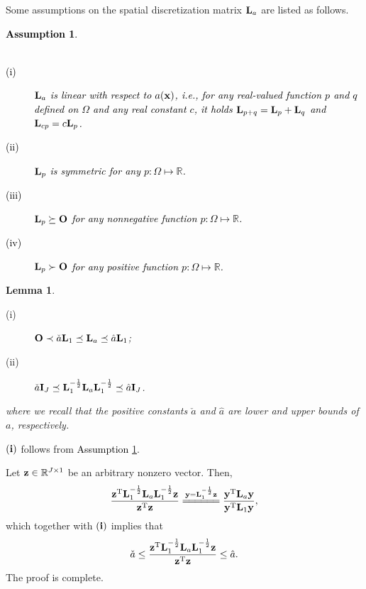 \documentclass[11pt]{article}%
\numberwithin{equation}{section}
\newtheorem{lemma}[theorem]{Lemma}
\newtheorem{assumption}{Assumption}
\newenvironment{proof}{\noindent{\bf Proof:}}{\hfill\fbox{}\vspace*{1mm}}
\begin{document}
Some assumptions on the spatial discretization matrix ${\bf L}_{a}$ are listed as follows.
\textcolor{black}{\begin{assumption}\label{diclaplaprop}
	\begin{description}
		\item[~]
		\item[(i)]${\bf L}_{a}$ is linear with respect to $a({\bf x})$, i.e., for any real-valued function $p$ and $q$ defined on $\Omega$ and any real constant $c$, it holds ${\bf L}_{p+q}={\bf L}_{p}+{\bf L}_{q}$ and ${\bf L}_{cp}=c{\bf L}_{p}$.
		\item[(ii)]${\bf L}_{p}$ is symmetric for any $p:\Omega\mapsto\mathbb{R}$.
		\item[(iii)]${\bf L}_{p}\succeq{\bf O}$ for any nonnegative function $p:\Omega\mapsto\mathbb{R}$.
		\item[(iv)] ${\bf L}_{p}\succ{\bf O}$ for any positive function $p:\Omega\mapsto\mathbb{R}$.
	\end{description}
\end{assumption}}


\begin{lemma}\label{barlineqs}
	\begin{description}
		\item[(i)]$ {\bf O}\prec\check{a}{\bf L}_{1}\preceq {\bf L}_a\preceq\hat{a}{\bf L}_{1}$;
		\item [(ii)] $\check{a}{\bf I}_{J}\preceq{\bf L}_{1}^{-\frac{1}{2}}{\bf L}_a{\bf L}_{1}^{-\frac{1}{2}}\preceq \hat{a}{\bf I}_{J}$.
	\end{description}
	where we recall that the positive constants $\check{a}$ and $\hat{a}$ are lower and upper bounds of $a$, respectively.
\end{lemma}
\begin{proof}
	${\bf (i)}$ follows from \textcolor{black}{Assumption \ref{diclaplaprop}}. 
	
	Let ${\bf z}\in\mathbb{R}^{J\times 1}$ be an arbitrary nonzero vector. Then,
	\begin{equation*}
	\frac{{\bf z}^{\rm T}{\bf L}_{1}^{-\frac{1}{2}}{\bf L}_a{\bf L}_{1}^{-\frac{1}{2}}{\bf z}}{{\bf z}^{\rm T}{\bf z}}\stackrel{{\bf y}={\bf L}_{1}^{-\frac{1}{2}}{\bf z}}{=\joinrel=\joinrel=\joinrel=\joinrel=\joinrel=}\frac{{\bf y}^{\rm T}{\bf L}_a{\bf y}}{{\bf y}^{\rm T}{\bf L}_{1}{\bf y}},
	\end{equation*}
	which together with ${\bf (i)}$ implies that
	\begin{equation*}
	\check{a}\leq\frac{{\bf z}^{\rm T}{\bf L}_{1}^{-\frac{1}{2}}{\bf L}_a{\bf L}_{1}^{-\frac{1}{2}}{\bf z}}{{\bf z}^{\rm T}{\bf z}}\leq\hat{a}.
	\end{equation*}
	The proof is complete.
\end{proof}
\end{document}

